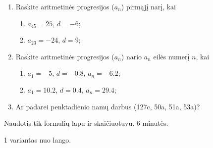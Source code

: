 \documentclass[14pt]{extarticle} %
\begin{document}
\thispagestyle{empty} %

\begin{enumerate}
    \item Raskite aritmetinės progresijos ($a_{n}$) pirmąjį narį, kai
          \begin{enumerate}
              \item $a_{45}=25$, $d=-6$;
              \item $a_{23}=-24$, $d=9$;
          \end{enumerate}
    \item Raskite aritmetinės progresijos ($a_{n}$) nario $a_{n}$ eilės numerį
          $n$, kai
          \begin{enumerate}
              \item $a_{1}=-5$, $d=-0.8$, $a_n=-6.2$;
              \item $a_{1}=10.2$, $d=0.4$, $a_n=29.4$;
          \end{enumerate}
    \item Ar padarei penktadienio namų darbus (127c, 50a, 51a, 53a)? 
\end{enumerate}

Naudotis tik formulių lapu ir skaičiuotuvu. 6 minutės. 

1 variantas nuo lango.
\end{document}
